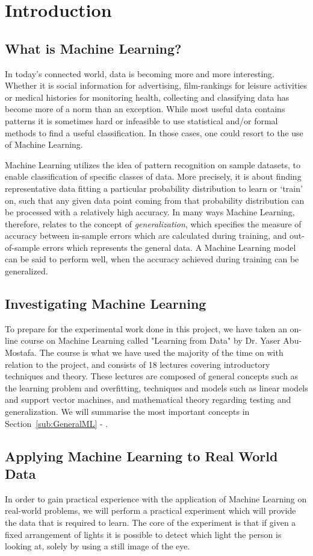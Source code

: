 \section{Introduction}
\label{sec:Introduction}
\subsection{What is Machine Learning?}
In today's connected world, data is becoming more and more interesting. 
Whether it is social information for advertising, film-rankings for leisure activities or medical histories for monitoring health,
collecting and classifying data has become more of a norm than an exception.
While most useful data contains patterns it is sometimes hard or infeasible to use statistical and/or formal methods 
to find a useful classification. In those cases, one could resort to the use of Machine Learning.

Machine Learning utilizes the idea of pattern recognition on sample datasets,
to enable classification of specific classes of data.
More precisely, it is about finding representative data fitting a particular probability distribution to learn or `train' on, 
such that any given data point coming from that probability distribution can be processed with a relatively high accuracy.
In many ways Machine Learning, therefore, relates to the concept of \emph{generalization}, which specifies 
the measure of accuracy between in-sample errors which are calculated during training, and out-of-sample errors which represents the general data.
A Machine Learning model can be said to perform well, when the accuracy achieved during training can be generalized.

\subsection{Investigating Machine Learning}
To prepare for the experimental work done in this project, we have taken an on-line course
on Machine Learning called "Learning from Data" by Dr. Yaser Abu-Mostafa\cite{learningfromdata2012course}.
The course is what we have used the majority of the time on with relation to the project, and consists
of 18 lectures covering introductory techniques and theory.
These lectures are composed of general concepts such as the learning problem and overfitting, 
techniques and models such as linear models and support vector machines, 
and mathematical theory regarding testing and generalization.
We will summarise the most important concepts in Section~\ref{sub:GeneralML} - .

\subsection{Applying Machine Learning to Real World Data}
In order to gain practical experience with the application of Machine Learning on real-world problems, we will perform a practical experiment
which will provide the data that is required to learn.
The core of the experiment is that if given a fixed arrangement of lights it is possible to detect which light the person is looking at, solely by using a still image of the eye.
